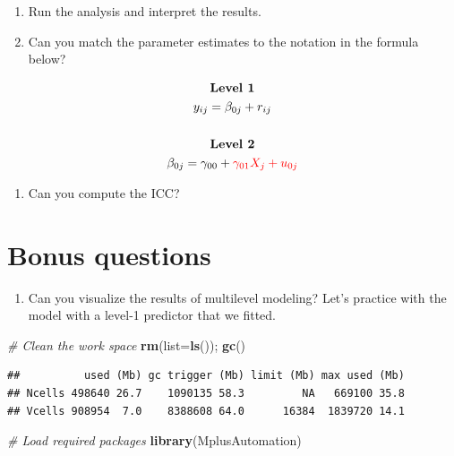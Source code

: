 \documentclass[
]{book}
\newenvironment{Shaded}{\begin{snugshade}}{\end{snugshade}}
\newcommand{\AttributeTok}[1]{\textcolor[rgb]{0.13,0.29,0.53}{#1}}
\newcommand{\CommentTok}[1]{\textcolor[rgb]{0.56,0.35,0.01}{\textit{#1}}}
\newcommand{\FunctionTok}[1]{\textcolor[rgb]{0.13,0.29,0.53}{\textbf{#1}}}
\newcommand{\NormalTok}[1]{#1}
\providecommand{\tightlist}{%
  \setlength{\itemsep}{0pt}\setlength{\parskip}{0pt}}
\begin{document}
\begin{enumerate}
\def\labelenumi{\arabic{enumi}.}
\setcounter{enumi}{1}
\item
  Run the analysis and interpret the results.
\item
  Can you match the parameter estimates to the notation in the formula below?
\end{enumerate}

\[
\begin{gathered}
\textbf{Level 1} \\
y_{ij}=\beta_{0j} + r_{ij} \\ \\
\textbf{Level 2} \\
\beta_{0j}=\gamma_{00} + \color{red}{\gamma_{01}X_{j}} + u_{0j}
\end{gathered}
\]

\begin{enumerate}
\def\labelenumi{\arabic{enumi}.}
\setcounter{enumi}{3}
\tightlist
\item
  Can you compute the ICC?
\end{enumerate}

\hypertarget{bonus-questions-3}{%
\section{Bonus questions}\label{bonus-questions-3}}

\begin{enumerate}
\def\labelenumi{\arabic{enumi}.}
\tightlist
\item
  Can you visualize the results of multilevel modeling? Let's practice with the model with a level-1 predictor that we fitted.
\end{enumerate}

\begin{Shaded}
\begin{Highlighting}[]
\CommentTok{\# Clean the work space}
\FunctionTok{rm}\NormalTok{(}\AttributeTok{list=}\FunctionTok{ls}\NormalTok{()); }\FunctionTok{gc}\NormalTok{()}
\end{Highlighting}
\end{Shaded}

\begin{verbatim}
##          used (Mb) gc trigger (Mb) limit (Mb) max used (Mb)
## Ncells 498640 26.7    1090135 58.3         NA   669100 35.8
## Vcells 908954  7.0    8388608 64.0      16384  1839720 14.1
\end{verbatim}

\begin{Shaded}
\begin{Highlighting}[]
\CommentTok{\# Load required packages}
\FunctionTok{library}\NormalTok{(MplusAutomation)}
\end{Highlighting}
\end{Shaded}
\end{document}
